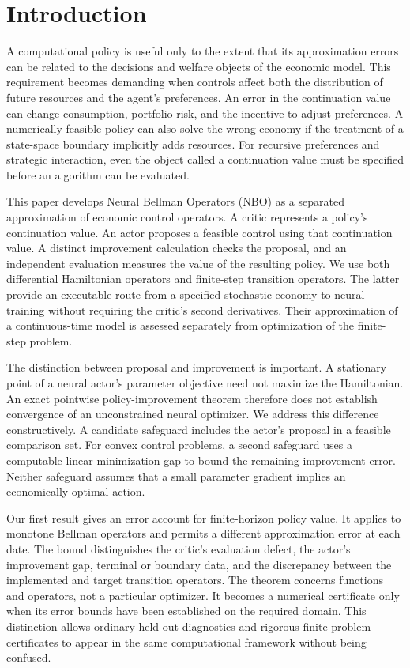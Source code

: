 \section{Introduction}
A computational policy is useful only to the extent that its approximation errors can be related to the decisions and welfare objects of the economic model. This requirement becomes demanding when controls affect both the distribution of future resources and the agent's preferences. An error in the continuation value can change consumption, portfolio risk, and the incentive to adjust preferences. A numerically feasible policy can also solve the wrong economy if the treatment of a state-space boundary implicitly adds resources. For recursive preferences and strategic interaction, even the object called a continuation value must be specified before an algorithm can be evaluated.

This paper develops Neural Bellman Operators (NBO) as a separated approximation of economic control operators. A critic represents a policy's continuation value. An actor proposes a feasible control using that continuation value. A distinct improvement calculation checks the proposal, and an independent evaluation measures the value of the resulting policy. We use both differential Hamiltonian operators and finite-step transition operators. The latter provide an executable route from a specified stochastic economy to neural training without requiring the critic's second derivatives. Their approximation of a continuous-time model is assessed separately from optimization of the finite-step problem.

The distinction between proposal and improvement is important. A stationary point of a neural actor's parameter objective need not maximize the Hamiltonian. An exact pointwise policy-improvement theorem therefore does not establish convergence of an unconstrained neural optimizer. We address this difference constructively. A candidate safeguard includes the actor's proposal in a feasible comparison set. For convex control problems, a second safeguard uses a computable linear minimization gap to bound the remaining improvement error. Neither safeguard assumes that a small parameter gradient implies an economically optimal action.

Our first result gives an error account for finite-horizon policy value. It applies to monotone Bellman operators and permits a different approximation error at each date. The bound distinguishes the critic's evaluation defect, the actor's improvement gap, terminal or boundary data, and the discrepancy between the implemented and target transition operators. The theorem concerns functions and operators, not a particular optimizer. It becomes a numerical certificate only when its error bounds have been established on the required domain. This distinction allows ordinary held-out diagnostics and rigorous finite-problem certificates to appear in the same computational framework without being confused.

